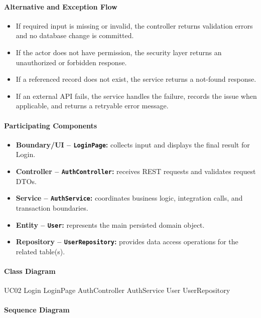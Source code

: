 \paragraph{Alternative and Exception Flow}

\begin{itemize}
    \item If required input is missing or invalid, the controller returns validation errors and no database change is committed.
    \item If the actor does not have permission, the security layer returns an unauthorized or forbidden response.
    \item If a referenced record does not exist, the service returns a not-found response.
    \item If an external API fails, the service handles the failure, records the issue when applicable, and returns a retryable error message.
\end{itemize}

\paragraph{Participating Components}

\begin{itemize}
    \item \textbf{Boundary/UI -- \texttt{LoginPage}:} collects input and displays the final result for Login.
    \item \textbf{Controller -- \texttt{AuthController}:} receives REST requests and validates request DTOs.
    \item \textbf{Service -- \texttt{AuthService}:} coordinates business logic, integration calls, and transaction boundaries.
    \item \textbf{Entity -- \texttt{User}:} represents the main persisted domain object.
    \item \textbf{Repository -- \texttt{UserRepository}:} provides data access operations for the related table(s).
\end{itemize}

\paragraph{Class Diagram}

\ClassDiagram
{UC02 Login}
{LoginPage}
{AuthController}
{AuthService}
{User}
{UserRepository}

\paragraph{Sequence Diagram}

